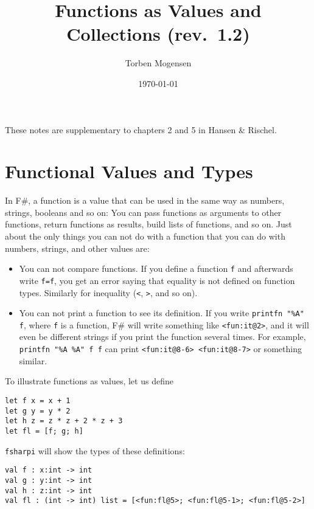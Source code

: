 \documentclass[a4paper]{article}
\begin{document}
\title{Functions as Values and Collections (rev.\ 1.2)}

\author{Torben Mogensen}
\date{\today}

\maketitle

\noindent
These notes are supplementary to chapters 2 and 5 in Hansen \&
Rischel.

\section{Functional Values and Types}

In F\#, a function is a value that can be used in the same way as
numbers, strings, booleans and so on: You can pass functions as
arguments to other functions, return functions as results, build lists
of functions, and so on.  Just about the only things you can not do
with a function that you can do with numbers, strings, and other
values are:

\begin{itemize}
\item You can not compare functions.  If you define a function
  \texttt{f} and afterwards write \texttt{f=f}, you get an error
  saying that equality is not defined on function types.  Similarly
  for inequality (\texttt{<}, \texttt{>}, and so on).
\item You can not print a function to see its definition.  If you
  write \texttt{printfn "\%A" f}, where \texttt{f} is a function, F\#
  will write something like \texttt{<fun:it@2>}, and it will even be
  different strings if you print the function several times.  For
  example, \texttt{printfn "\%A \%A" f f} can print
  \texttt{<fun:it@8-6> <fun:it@8-7>} or something similar.
\end{itemize}

\noindent
To illustrate functions as values, let us define

\begin{verbatim}
let f x = x + 1
let g y = y * 2
let h z = z * z + 2 * z + 3
let fl = [f; g; h]
\end{verbatim}

\noindent
\texttt{fsharpi} will show the types of these definitions:

\begin{verbatim}
val f : x:int -> int
val g : y:int -> int
val h : z:int -> int
val fl : (int -> int) list = [<fun:fl@5>; <fun:fl@5-1>; <fun:fl@5-2>]
\end{verbatim}
\end{document}
